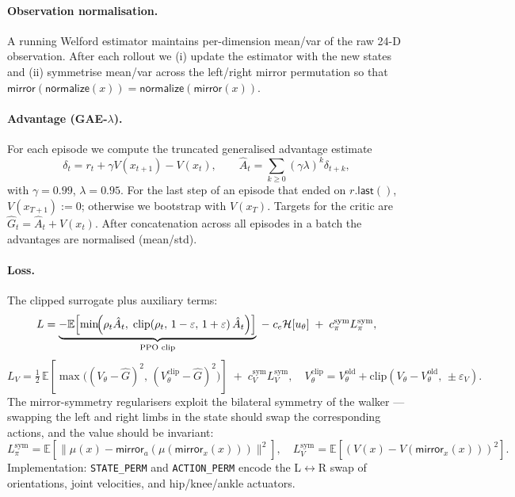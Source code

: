 \documentclass[11pt]{article}
\begin{document}
\paragraph{Observation normalisation.} A running Welford estimator
maintains per-dimension mean/var of the raw 24-D observation. After
each rollout we (i) update the estimator with the new states and
(ii) symmetrise mean/var across the left/right mirror permutation
so that $\textsf{mirror}(\textsf{normalize}(x)) =
\textsf{normalize}(\textsf{mirror}(x))$.

\paragraph{Advantage (GAE-$\lambda$).} For each episode we compute
the truncated generalised advantage estimate
\[
\delta_t = r_t + \gamma V(x_{t+1}) - V(x_t),
\qquad
\hat A_t = \sum_{k\ge 0} (\gamma\lambda)^k \delta_{t+k},
\]
with $\gamma = 0.99$, $\lambda = 0.95$. For the last step of an episode
that ended on $r.\textsf{last}()$, $V(x_{T+1}) := 0$; otherwise we
bootstrap with $V(x_T)$. Targets for the critic are
$\hat G_t = \hat A_t + V(x_t)$. After concatenation across all episodes
in a batch the advantages are normalised (mean/std).

\paragraph{Loss.} The clipped surrogate plus auxiliary terms:
\[
L = \underbrace{-\mathbb E\!\left[\min\!\Bigl(\rho_t \hat A_t,\;
\mathrm{clip}(\rho_t,\,1-\varepsilon,\,1+\varepsilon)\,\hat A_t\Bigr)\right]}_{\text{PPO clip}}
\;-\; c_e \mathcal H[u_\theta]
\;+\; c_\pi^{\text{sym}} L^{\text{sym}}_\pi,
\]
\[
L_V = \tfrac12\,\mathbb E\!\left[\max\!\bigl((V_\theta - \hat G)^2,\,
(V_\theta^{\text{clip}} - \hat G)^2\bigr)\right]
\;+\; c_V^{\text{sym}} L^{\text{sym}}_V,
\quad
V_\theta^{\text{clip}} = V_\theta^{\text{old}} + \mathrm{clip}(V_\theta - V_\theta^{\text{old}},\,\pm\varepsilon_V).
\]
The mirror-symmetry regularisers exploit the bilateral symmetry of the
walker --- swapping the left and right limbs in the state should swap
the corresponding actions, and the value should be invariant:
\[
L^{\text{sym}}_\pi = \mathbb E\!\left[\bigl\|\mu(x) - \textsf{mirror}_a(\mu(\textsf{mirror}_x(x)))\bigr\|^2\right],
\quad
L^{\text{sym}}_V = \mathbb E\!\left[(V(x) - V(\textsf{mirror}_x(x)))^2\right].
\]
Implementation: \texttt{STATE\_PERM} and \texttt{ACTION\_PERM} encode
the L$\leftrightarrow$R swap of orientations, joint velocities, and
hip/knee/ankle actuators.
\end{document}
